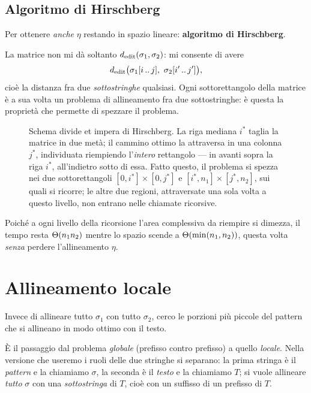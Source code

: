 \subsection{Algoritmo di Hirschberg}

Per ottenere \emph{anche} $\eta$ restando in spazio lineare: \textbf{algoritmo
di Hirschberg}.

\begin{osservazione}
  La matrice non mi dà soltanto $d_{\mathrm{edit}}(\sigma_1,\sigma_2)$: mi consente di
  avere
  \[
    \dedit\bigl(\sub{\sigma_1}{i}{j},\ \sub{\sigma_2}{i'}{j'}\bigr),
  \]
  cioè la distanza fra due \emph{sottostringhe} qualsiasi. Ogni sottorettangolo
  della matrice è a sua volta un problema di allineamento fra due sottostringhe:
  è questa la proprietà che permette di spezzare il problema.
\end{osservazione}

\begin{figure}[H]
  \centering
  
  \caption{Schema divide et impera di Hirschberg. La riga mediana $i^{*}$ taglia
  la matrice in due metà; il cammino ottimo la attraversa in una colonna
  $j^{*}$, individuata riempiendo l'\emph{intero} rettangolo --- in avanti sopra
  la riga $i^{*}$, all'indietro sotto di essa. Fatto questo, il problema si
  spezza nei due sottorettangoli $[0,i^{*}]\times[0,j^{*}]$ e
  $[i^{*},n_1]\times[j^{*},n_2]$, sui quali si ricorre; le altre due regioni,
  attraversate una sola volta a questo livello, non entrano nelle chiamate
  ricorsive.}
  \label{fig:hirschberg-divide}
\end{figure}

Poiché a ogni livello della ricorsione l'area complessiva da riempire si
dimezza, il tempo resta $\Theta(n_1 n_2)$ mentre lo spazio scende a
$\Theta(\min(n_1,n_2))$, questa volta \emph{senza} perdere l'allineamento $\eta$.


\section{Allineamento locale}

%
Invece di allineare tutto $\sigma_1$ con tutto $\sigma_2$, cerco le porzioni più
piccole del pattern che si allineano in modo ottimo con il testo.

\begin{osservazione}
  È il passaggio dal problema \emph{globale} (prefisso contro prefisso) a quello
  \emph{locale}. Nella versione che useremo i ruoli delle due stringhe si
  separano: la prima stringa è il \emph{pattern} e la chiamiamo $\sigma$, la
  seconda è il \emph{testo} e la chiamiamo $T$; si vuole allineare \emph{tutto}
  $\sigma$ con una \emph{sottostringa} di $T$, cioè con un suffisso di un
  prefisso di $T$.
\end{osservazione}

